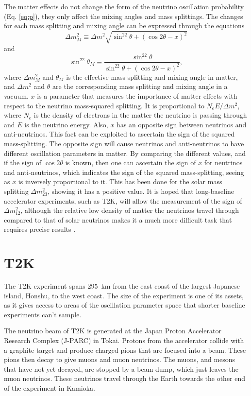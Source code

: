 \documentclass[aps,pra,12pt,notitlepage,tightenlines]{revtex4-1}
\begin{document}
The matter effects do not change the form of the neutrino oscillation probability (Eq. \ref{eq:p}), they only affect the mixing angles and mass splittings. The changes for each mass splitting and mixing angle can be expressed through the equations 
\begin{equation}
\Delta m^2_M \equiv \Delta m^2\sqrt{\sin^22\theta + (\cos2\theta - x)^2}
\end{equation}
and 
\begin{equation}
\sin^22\theta_M \equiv \frac{\sin^22\theta}{\sin^22\theta + (\cos2\theta - x)^2}, 
\end{equation}
where $\Delta m^2_M$ and $\theta_M$ is the effective mass splitting and mixing angle in matter, and $\Delta m^2$ and $\theta$ are the corresponding mass splitting and mixing angle in a vacuum. $x$ is a parameter that measures the importance of matter effects with respect to the neutrino mass-squared splitting. It is proportional to $N_eE/\Delta m^2$, where $N_e$ is the density of electrons in the matter the neutrino is passing through and $E$ is the neutrino energy. Also, $x$ has an opposite sign between neutrinos and anti-neutrinos. This fact can be exploited to ascertain the sign of the squared mass-splitting. The opposite sign will cause neutrinos and anti-neutrinos to have different oscillation parameters in matter. By comparing the different values, and if the sign of $\cos2\theta$ is known, then one can ascertain the sign of $x$ for neutrinos and anti-neutrinos, which indicates the sign of the squared mass-splitting, seeing as $x$ is inversely proportional to it. This has been done for the solar mass splitting $\Delta m^2_{23}$, showing it has a positive value. It is hoped that long-baseline accelerator experiments, such as T2K, will allow the measurement of the sign of $\Delta m^2_{12}$, although the relative low density of matter the neutrinos travel through compared to that of solar neutrinos makes it a much more difficult task that requires precise results \cite{Kayser:2005cd}.

\section{T2K}
The T2K experiment spans 295~km from the east coast of the largest Japanese island, Honshu, to the west coast. The size of the experiment is one of its assets, as it gives access to areas of the oscillation parameter space that shorter baseline experiments can't sample. 

The neutrino beam of T2K is generated at the Japan Proton Accelerator Research Complex (J-PARC) in Tokai. Protons from the accelerator collide with a graphite target and produce charged pions that are focused into a beam. These pions then decay to give muons and muon neutrinos. The muons, and mesons that have not yet decayed, are stopped by a beam dump, which just leaves the muon neutrinos. These neutrinos travel through the Earth towards the other end of the experiment in Kamioka. 
\end{document}
